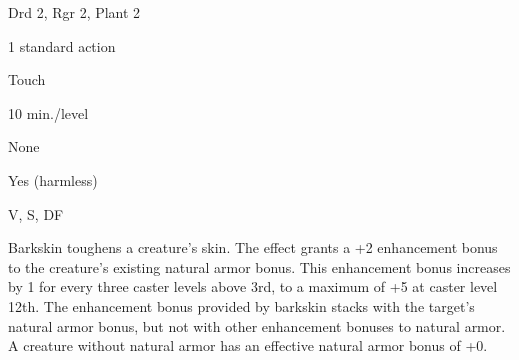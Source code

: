 
\begin{description*}
\item[Level:] Drd 2, Rgr 2, Plant 2
\item[Casting Time:] 1 standard action
\item[Range:] Touch
\item[Duration:] 10 min./level
\item[Saving Throw:] None
\item[Spell Resistance:] Yes (harmless)
\item[Components:] V, S, DF
\end{description*}

Barkskin toughens a creature's skin. The effect grants a +2 enhancement
bonus to the creature's existing natural armor bonus. This enhancement bonus increases
by 1 for every three caster levels above 3rd, to a maximum of +5 at caster level
12th.
The enhancement bonus provided by barkskin stacks with the target's natural
armor bonus, but not with other enhancement bonuses to natural armor. A creature
without natural armor has an effective natural armor bonus of +0.